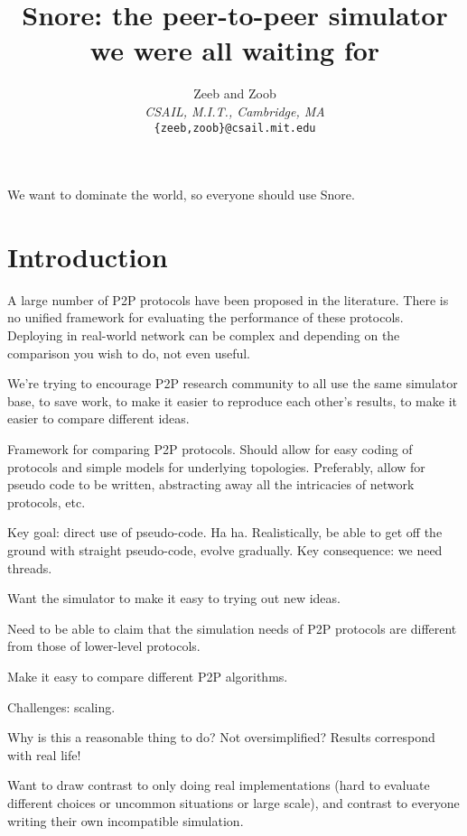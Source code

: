 \documentclass[letterpaper,twocolumn,10pt]{article}
\title{\Large \bf Snore: the peer-to-peer simulator we were all waiting for}
\author{Zeeb and Zoob \\
{\em CSAIL, M.I.T., Cambridge, MA} \\
{\tt \{zeeb,zoob\}@csail.mit.edu}}
\date{}
\begin{document}
\maketitle

\begin{abstract}
\end{abstract}

We want to dominate the world, so everyone should use Snore.

\thispagestyle{empty}
\section{Introduction}
\label{Section:Introduction}

A large number of P2P protocols have been proposed in the literature.  There
is no unified framework for evaluating the performance of these protocols.
Deploying in real-world network can be complex and depending on the comparison
you wish to do, not even useful.

We're trying to encourage P2P research community to all use the same
simulator base, to save work, to make it easier to reproduce each
other's results, to make it easier to compare different ideas.

Framework for comparing P2P protocols.  Should allow for easy coding of
protocols and simple models for underlying topologies.  Preferably, allow for
pseudo code to be written, abstracting away all the intricacies of network
protocols, etc.

Key goal: direct use of pseudo-code. Ha ha. Realistically, be able to
get off the ground with straight pseudo-code, evolve gradually. Key
consequence: we need threads.

Want the simulator to make it easy to trying out new ideas.

Need to be able to claim that the simulation needs of P2P protocols
are different from those of lower-level protocols.

Make it easy to compare different P2P algorithms.

Challenges: scaling.

Why is this a reasonable thing to do?  Not oversimplified?  Results correspond
with real life!

Want to draw contrast to only doing real implementations (hard to
evaluate different choices or uncommon situations or large scale), and
contrast to everyone writing their own incompatible simulation.
\end{document}
